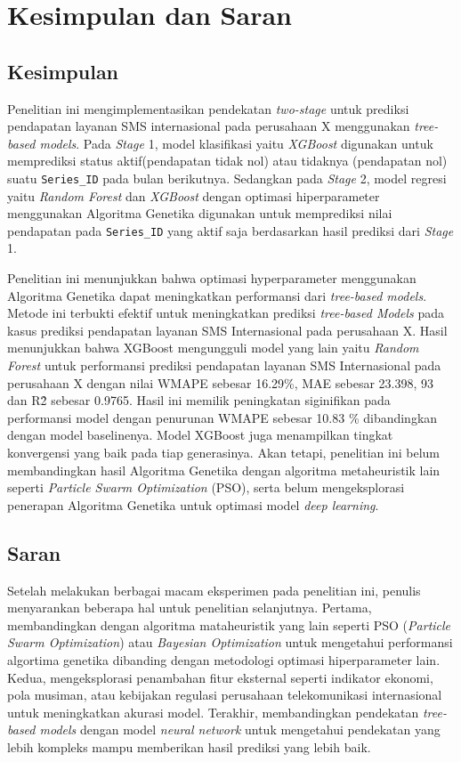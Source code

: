 \chapter{Kesimpulan dan Saran}
    \section{Kesimpulan}

        Penelitian ini mengimplementasikan pendekatan \textit{two-stage} untuk prediksi pendapatan layanan SMS internasional pada perusahaan X menggunakan \textit{tree-based models}. Pada \textit{Stage} 1, model klasifikasi yaitu \textit{XGBoost} digunakan untuk memprediksi status aktif(pendapatan tidak nol) atau tidaknya (pendapatan nol) suatu \texttt{Series\_ID} pada bulan berikutnya. Sedangkan pada \textit{Stage} 2, model regresi yaitu \textit{Random Forest} dan \textit{XGBoost} dengan optimasi hiperparameter menggunakan Algoritma Genetika digunakan untuk memprediksi nilai pendapatan pada \texttt{Series\_ID} yang aktif saja berdasarkan hasil prediksi dari \textit{Stage} 1. 

        Penelitian ini menunjukkan bahwa optimasi hyperparameter menggunakan Algoritma Genetika dapat meningkatkan performansi dari \textit{tree-based models}. Metode ini terbukti efektif untuk meningkatkan prediksi \textit{tree-based Models} pada kasus prediksi pendapatan layanan SMS Internasional pada perusahaan X. Hasil menunjukkan bahwa XGBoost mengungguli model yang lain yaitu \textit{Random Forest} untuk performansi prediksi pendapatan layanan SMS Internasional pada perusahaan X dengan nilai WMAPE sebesar 16.29\%, MAE sebesar 23.398, 93 dan R\^2 sebesar 0.9765. Hasil ini memilik peningkatan siginifikan pada performansi model dengan penurunan WMAPE sebesar 10.83 \% dibandingkan dengan model baselinenya. Model XGBoost juga menampilkan tingkat konvergensi yang baik pada tiap generasinya. Akan tetapi, penelitian ini belum membandingkan hasil Algoritma Genetika dengan algoritma metaheuristik lain seperti \textit{Particle Swarm Optimization} (PSO), serta belum mengeksplorasi penerapan Algoritma Genetika untuk optimasi model \textit{deep learning}.


    \section{Saran}

        Setelah melakukan berbagai macam eksperimen pada penelitian ini, penulis menyarankan beberapa hal untuk penelitian selanjutnya.  Pertama, membandingkan dengan algoritma mataheuristik yang lain seperti PSO (\textit{Particle Swarm Optimization}) atau \textit{Bayesian Optimization} untuk mengetahui performansi algortima genetika dibanding dengan metodologi optimasi hiperparameter lain. Kedua, mengeksplorasi penambahan fitur eksternal seperti indikator ekonomi, pola musiman, atau kebijakan regulasi perusahaan telekomunikasi internasional untuk meningkatkan akurasi model. Terakhir, membandingkan pendekatan \textit{tree-based models} dengan model \textit{neural network} untuk mengetahui pendekatan yang lebih kompleks mampu memberikan hasil prediksi yang lebih baik. 
